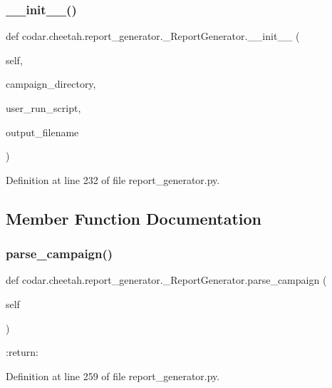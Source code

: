 \subsubsection{\texorpdfstring{\+\_\+\+\_\+init\+\_\+\+\_\+()}{\_\_init\_\_()}}
{\footnotesize\ttfamily def codar.\+cheetah.\+report\+\_\+generator.\+\_\+\+Report\+Generator.\+\_\+\+\_\+init\+\_\+\+\_\+ (\begin{DoxyParamCaption}\item[{}]{self,  }\item[{}]{campaign\+\_\+directory,  }\item[{}]{user\+\_\+run\+\_\+script,  }\item[{}]{output\+\_\+filename }\end{DoxyParamCaption})}



Definition at line 232 of file report\+\_\+generator.\+py.



\subsection{Member Function Documentation}
\mbox{\label{classcodar_1_1cheetah_1_1report__generator_1_1___report_generator_af247fa30d32308bfa7119cebcf9e7742}} 
\subsubsection{\texorpdfstring{parse\+\_\+campaign()}{parse\_campaign()}}
{\footnotesize\ttfamily def codar.\+cheetah.\+report\+\_\+generator.\+\_\+\+Report\+Generator.\+parse\+\_\+campaign (\begin{DoxyParamCaption}\item[{}]{self }\end{DoxyParamCaption})}

\begin{DoxyVerb}:return:
\end{DoxyVerb}
 

Definition at line 259 of file report\+\_\+generator.\+py.

